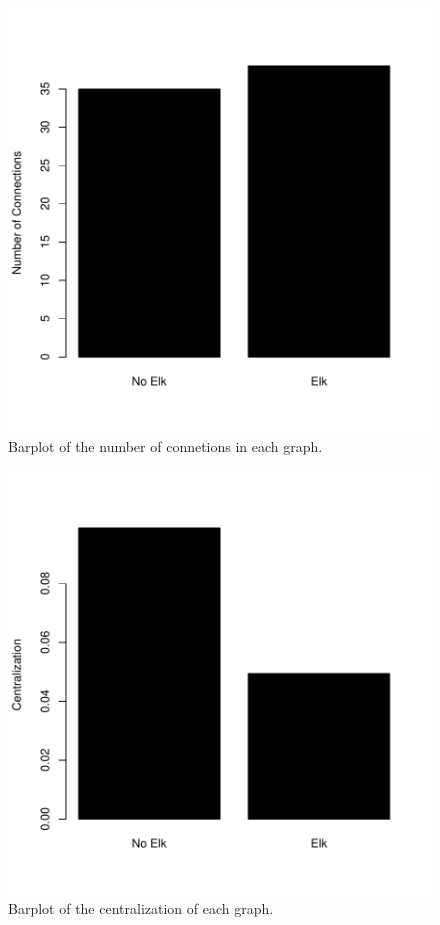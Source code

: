 \documentclass[11pt]{amsart}
\begin{document}
\begin{figure} 
\begin{center} 
\includegraphics{SPN_figures-bpL}
\end{center} 
\caption{Barplot of the number of connetions in each graph.} 
\label{fig:three}
\end{figure}

\begin{figure} 
\begin{center} 
\includegraphics{SPN_figures-bpC}
\end{center} 
\caption{Barplot of the centralization of each graph.} 
\label{fig:four}
\end{figure}
\end{document}
